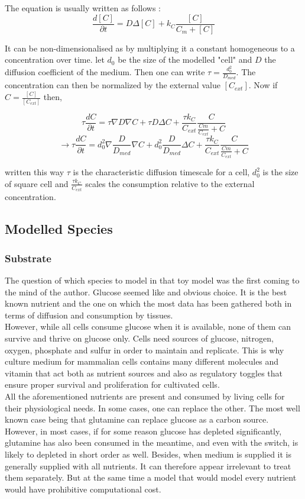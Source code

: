 \documentclass[11pt,a4paper]{article}
\begin{document}
The equation is usually written as follows : 
\[ \frac{d [C]}{\partial t}  =  D \Delta [C] + k_C \frac{[C]}{C_m + [C]} \]

It can be non-dimensionalised as by multiplying it a constant homogeneous to a concentration over time. let $d_0$ be the size of the modelled "cell" 
and $D$ the diffusion coefficient of the medium. Then one can write $\tau  = \frac{d_0^2}{D_{med}}$. The concentration can then be normalized by the external value $[C_{ext}]$. Now if $C = \frac{[C]}{[C_{ext}]}$ then, 

\[ \tau \frac{d C}{\partial t}  = \tau \nabla D \nabla C + \tau  D  \Delta C + \frac{\tau k_C}{C_{ext}} \frac{C}{\frac{Cm}{C_{ext}} + C}  \]
\[ \rightarrow \tau \frac{d C}{\partial t}  = d_0^2 \nabla \frac{D}{D_{med}} \nabla C + d_0^2 \frac{D}{D_{med}} \Delta C + \frac{\tau k_C}{C_{ext}} \frac{C}{\frac{Cm}{C_{ext}} + C}  \]

written this way $\tau$ is the characteristic diffusion timescale for a cell, $d_0^2$ is the size of square cell and $\frac{\tau k_C}{C_{ext}}$ scales the consumption relative to the external concentration.

\subsection{Modelled Species}
\subsubsection{Substrate}
The question of which species to model in that toy model was the first coming to the mind of the author. Glucose seemed like and obvious choice. It is the best known nutrient and the one on which the most data has been gathered both in terms of diffusion and consumption by tissues.\\

However, while all cells consume glucose when it is available, none of them can survive and thrive on glucose only. Cells need sources of glucose, nitrogen, oxygen, phosphate and sulfur in order to maintain and replicate. This is why culture medium for mammalian cells contains many different molecules and vitamin that act both as nutrient sources and also as regulatory toggles that ensure proper survival and proliferation for cultivated cells.\\

All the aforementioned nutrients are present and consumed by living cells for their physiological needs. In some cases, one can replace the other. The most well known case being that glutamine can replace glucose as a carbon source. However, in most cases, if for some reason glucose has depleted significantly, glutamine has also been consumed in the meantime, and even with the switch, is likely to depleted in short order as well. Besides, when medium is supplied it is generally supplied with all nutrients. It can therefore appear irrelevant to treat them separately. But at the same time a model that would model every nutrient would have prohibitive computational cost.\\
\end{document}
